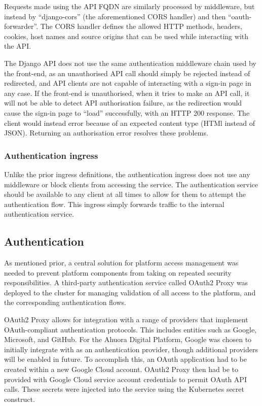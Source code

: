 Requests made using the API FQDN are similarly processed by middleware, but instead by ``django-cors'' (the aforementioned CORS handler) and then ``oauth-forwarder''. The CORS handler defines the allowed HTTP methods, headers, cookies, host names and source origins that can be used while interacting with the API.

The Django API does not use the same authentication middleware chain used by the front-end, as an unauthorised API call should simply be rejected instead of redirected, and API clients are not capable of interacting with a sign-in page in any case. If the front-end is unauthorised, when it tries to make an API call, it will not be able to detect API authorisation failure, as the redirection would cause the sign-in page to ``load'' successfully, with an HTTP 200 response. The client would instead error because of an expected content type (HTMl instead of JSON). Returning an authorisation error resolves these problems.

\subsubsection{Authentication ingress}

Unlike the prior ingress definitions, the authentication ingress does not use any middleware or block clients from accessing the service. The authentication service should be available to any client at all times to allow for them to attempt the authentication flow. This ingress simply forwards traffic to the internal authentication service.

\subsection{Authentication}

As mentioned prior, a central solution for platform access management was needed to prevent platform components from taking on repeated security responsibilities. A third-party authentication service called OAuth2 Proxy was deployed to the cluster for managing validation of all access to the platform, and the corresponding authentication flows.

OAuth2 Proxy allows for integration with a range of providers that implement OAuth-compliant authentication protocols. This includes entities such as Google, Microsoft, and GitHub. For the Ahuora Digital Platform, Google was chosen to initially integrate with as an authentication provider, though additional providers will be enabled in future. To accomplish this, an OAuth application had to be created within a new Google Cloud account. OAuth2 Proxy then had be to provided with Google Cloud service account credentials to permit OAuth API calls. These secrets were injected into the service using the Kubernetes secret construct.

